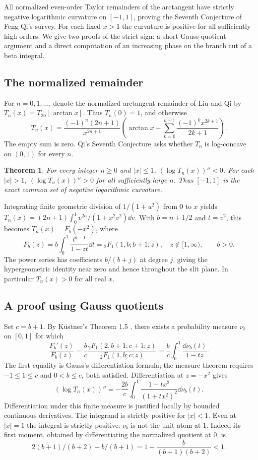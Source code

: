 \documentclass[11pt,a4paper]{article}
\numberwithin{equation}{section}
\newtheorem{theorem}{Theorem}[section]
\theoremstyle{definition}
\theoremstyle{remark}
\newenvironment{sectionabstract}{\par\smallskip\begingroup\small\noindent}{\par\endgroup\medskip}
\begin{document}
\begin{sectionabstract}
All normalized even-order Taylor remainders of the arctangent have strictly
negative logarithmic curvature on $[-1,1]$, proving the Seventh Conjecture of
Feng Qi's survey. For each fixed $x>1$ the curvature is positive for all
sufficiently high orders. We give two proofs of the strict sign: a short
Gauss-quotient argument and a direct computation of an increasing phase
on the branch cut of a beta integral.
\end{sectionabstract}
\subsection{The normalized remainder}
For $n=0,1,\ldots$, denote the normalized arctangent remainder of Liu and
Qi \cite{r30heisei:LQ} by $T_n(x)=T_{2n}[\arctan x]$. Thus $T_n(0)=1$, and otherwise
\[
 T_n(x)=\frac{(-1)^n(2n+1)}{x^{2n+1}}
 \left(\arctan x-\sum_{k=0}^{n-1}\frac{(-1)^kx^{2k+1}}{2k+1}\right).
\]
The empty sum is zero. Qi's Seventh Conjecture \cite[\S12.7.1.7]{r30heisei:Q} asks
whether $T_n$ is log-concave on $(0,1)$ for every $n$.
\begin{theorem}\label{r30heisei:main}
For every integer $n\ge0$ and $|x|\le1$, $(\log T_n(x))''<0$.
For each $|x|>1$, $(\log T_n(x))''>0$ for all sufficiently large $n$.
Thus $[-1,1]$ is the exact common set of negative logarithmic curvature.
\end{theorem}
Integrating finite geometric division of $1/(1+u^2)$ from $0$ to $x$ yields
$T_n(x)=(2n+1)\int_0^1 v^{2n}/(1+x^2v^2)\dd v$. With
$b=n+1/2$ and $t=v^2$, this becomes $T_n(x)=F_b(-x^2)$, where
\[
 F_b(z)= b\int_0^1\frac{t^{b-1}}{1-zt}\dd t
       ={}_2F_1(1,b;b+1;z),\quad z\notin[1,\infty),\qquad b>0 .
\]
The power series has coefficients $b/(b+j)$ at degree $j$, giving the
hypergeometric identity near zero and hence throughout the slit plane.
In particular $T_n(x)>0$ for all real $x$.
\subsection{A proof using Gauss quotients}
Set $c=b+1$. By K\"ustner's Theorem 1.5 \cite[p.~606]{r30heisei:K}, there exists
a probability measure $\nu_b$ on $[0,1]$ for which
\[
 \frac{F_b'(z)}{F_b(z)}
 =\frac{b}{c}\frac{{}_2F_1(2,b+1;c+1;z)}{{}_2F_1(1,b;c;z)}
 =\frac{b}{c}\int_0^1\frac{\dd\nu_b(t)}{1-tz}.
\]
The first equality is Gauss's differentiation formula; the measure theorem
requires $-1\le 1\le c$ and $0<b\le c$, both satisfied.
Differentiation at $z=-x^2$ gives
\begin{equation}\label{r30heisei:curv}
 (\log T_n(x))''=-\frac{2b}{c}\int_0^1
                   \frac{1-tx^2}{(1+tx^2)^2}\dd\nu_b(t).
\end{equation}
Differentiation under this finite measure is justified locally by bounded
continuous derivatives. The integrand is strictly positive for $|x|<1$.
Even at $|x|=1$ the integral is strictly positive: $\nu_b$ is not the unit
atom at $1$. Indeed its first moment, obtained by differentiating the
normalized quotient at $0$, is
\[
 2(b+1)/(b+2)-b/(b+1)=1-\frac{b}{(b+1)(b+2)}<1.
\]
\end{document}
